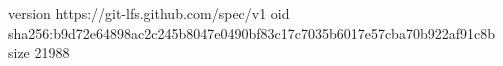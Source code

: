 version https://git-lfs.github.com/spec/v1
oid sha256:b9d72e64898ac2c245b8047e0490bf83c17c7035b6017e57cba70b922af91c8b
size 21988
